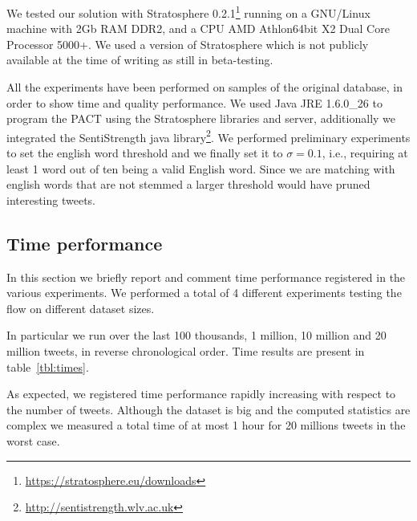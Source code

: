 We tested our solution with Stratosphere 0.2.1\footnote{\url{https://stratosphere.eu/downloads}} running on a GNU/Linux machine with 2Gb RAM DDR2, and a CPU AMD Athlon\texttrademark 64bit X2 Dual Core Processor 5000+.%
We used a version of Stratosphere which is not publicly available at the time of writing as still in beta-testing.

All the experiments have been performed on samples of the original database, in order to show time and quality performance. 
We used Java JRE 1.6.0\_26 to program the PACT using the Stratosphere libraries and server, additionally we integrated the SentiStrength java library\footnote{\url{http://sentistrength.wlv.ac.uk}}. 
We performed preliminary experiments to set the english word threshold and we finally set it to $\sigma=0.1$, i.e., requiring at least 1 word out of ten being a valid English word.
Since we are matching with english words that are not stemmed a larger threshold would have pruned interesting tweets.  

\subsection{Time performance}
In this section we briefly report and comment time performance registered in the various experiments.
We performed a total of 4 different experiments testing the flow on different dataset sizes. 

In particular we run over the last 100 thousands, 1 million, 10 million and 20 million tweets, in reverse chronological order.
Time results are present in table~\ref{tbl:times}. 

As expected, we registered time performance rapidly increasing with respect to the number of tweets.
Although the dataset is big and the computed statistics are complex we measured a total time of at most 1 hour for 20 millions tweets in the worst case.

